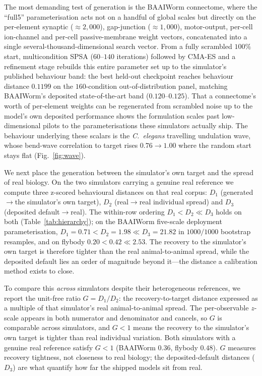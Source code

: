 \documentclass[11pt]{article}
\begin{document}
The most demanding test of generation is the BAAIWorm connectome, where the ``full5'' parameterisation acts not on a handful of global scales but directly on the per-element synaptic ($\approx2{,}000$), gap-junction ($\approx1{,}000$), motor-output, per-cell ion-channel and per-cell passive-membrane weight vectors, concatenated into a single several-thousand-dimensional search vector. From a fully scrambled $100\%$ start, multicondition SPSA ($60$--$140$ iterations) followed by CMA-ES and a refinement stage rebuilds this entire parameter set up to the simulator's published behaviour band: the best held-out checkpoint reaches behaviour distance $0.1199$ on the $160$-condition out-of-distribution panel, matching BAAIWorm's deposited state-of-the-art band ($0.120$--$0.125$). That a connectome's worth of per-element weights can be regenerated from scrambled noise up to the model's own deposited performance shows the formulation scales past low-dimensional pilots to the parameterisations these simulators actually ship. The behaviour underlying these scalars is the \emph{C.~elegans} travelling undulation wave, whose bend-wave correlation to target rises $0.76\to1.00$ where the random start stays flat (Fig.~\ref{fig:wave}).

We next place the generation between the simulator's own target and the spread of real biology. On the two simulators carrying a genuine real reference we compute three z-scored behavioural distances on that real corpus: $D_1$ (generated$\to$the simulator's own target), $D_2$ (real$\to$real individual spread) and $D_3$ (deposited default$\to$real). The within-row ordering $D_1{<}D_2{\ll}D_3$ holds on both (Table~\ref{tab:hierarchy}); on the BAAIWorm five-scale deployment parameterisation, $D_1{=}0.71<D_2{=}1.98\ll D_3{=}21.82$ in $1000/1000$ bootstrap resamples, and on flybody $0.20<0.42\ll2.53$. The recovery to the simulator's own target is therefore tighter than the real animal-to-animal spread, while the deposited default lies an order of magnitude beyond it---the distance a calibration method exists to close.

To compare this \emph{across} simulators despite their heterogeneous references, we report the unit-free ratio $G{=}D_1/D_2$: the recovery-to-target distance expressed as a multiple of that simulator's real animal-to-animal spread. The per-observable $z$-scale appears in both numerator and denominator and cancels, so $G$ is comparable across simulators, and $G{<}1$ means the recovery to the simulator's own target is tighter than real individual variation. Both simulators with a genuine real reference satisfy $G{<}1$ (BAAIWorm $0.36$, flybody $0.48$). $G$ measures recovery tightness, not closeness to real biology; the deposited-default distances ($D_3$) are what quantify how far the shipped models sit from real.
\end{document}
